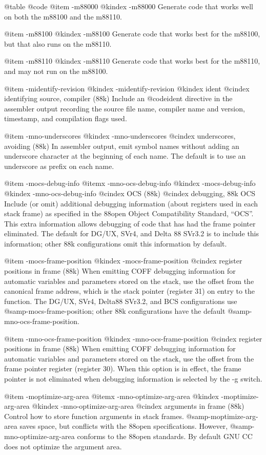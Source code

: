 {{@table @code
@item -m88000
@kindex -m88000
Generate code that works well on both the m88100 and the
m88110.

@item -m88100
@kindex -m88100
Generate code that works best for the m88100, but that also
runs on the m88110.

@item -m88110
@kindex -m88110
Generate code that works best for the m88110, and may not run
on the m88100.

@item -midentify-revision
@kindex -midentify-revision
@kindex ident
@cindex identifying source, compiler (88k)
Include an @code{ident} directive in the assembler output recording the
source file name, compiler name and version, timestamp, and compilation
flags used.

@item -mno-underscores
@kindex -mno-underscores
@cindex underscores, avoiding (88k)
In assembler output, emit symbol names without adding an underscore
character at the beginning of each name.  The default is to use an
underscore as prefix on each name.

@item -mocs-debug-info
@itemx -mno-ocs-debug-info
@kindex -mocs-debug-info
@kindex -mno-ocs-debug-info
@cindex OCS (88k)
@cindex debugging, 88k OCS
Include (or omit) additional debugging information (about registers used
in each stack frame) as specified in the 88open Object Compatibility
Standard, ``OCS''.  This extra information allows debugging of code that
has had the frame pointer eliminated.  The default for DG/UX, SVr4, and
Delta 88 SVr3.2 is to include this information; other 88k configurations
omit this information by default.

@item -mocs-frame-position
@kindex -mocs-frame-position
@cindex register positions in frame (88k)
When emitting COFF debugging information for automatic variables and
parameters stored on the stack, use the offset from the canonical frame
address, which is the stack pointer (register 31) on entry to the
function.  The DG/UX, SVr4, Delta88 SVr3.2, and BCS configurations use
@samp{-mocs-frame-position}; other 88k configurations have the default
@samp{-mno-ocs-frame-position}.

@item -mno-ocs-frame-position
@kindex -mno-ocs-frame-position
@cindex register positions in frame (88k)
When emitting COFF debugging information for automatic variables and
parameters stored on the stack, use the offset from the frame pointer
register (register 30).  When this option is in effect, the frame
pointer is not eliminated when debugging information is selected by the
-g switch.

@item -moptimize-arg-area
@itemx -mno-optimize-arg-area
@kindex -moptimize-arg-area
@kindex -mno-optimize-arg-area
@cindex arguments in frame (88k)
Control how to store function arguments in stack frames.
@samp{-moptimize-arg-area} saves space, but conflicts with the 88open
specifications.  However, @samp{-mno-optimize-arg-area} conforms to the
88open standards.  By default GNU CC does not optimize the argument
area.

}}
